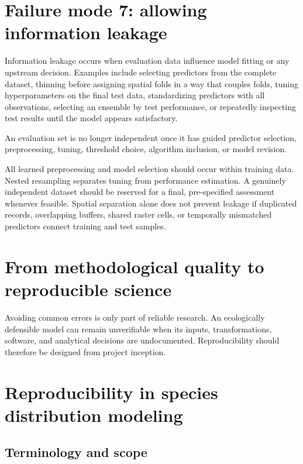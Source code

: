 \section{Failure mode 7: allowing information leakage}

Information leakage occurs when evaluation data influence model fitting or any upstream decision. Examples include selecting predictors from the complete dataset, thinning before assigning spatial folds in a way that couples folds, tuning hyperparameters on the final test data, standardizing predictors with all observations, selecting an ensemble by test performance, or repeatedly inspecting test results until the model appears satisfactory.

\begin{sdmwarningbox}
An evaluation set is no longer independent once it has guided predictor selection, preprocessing, tuning, threshold choice, algorithm inclusion, or model revision.
\end{sdmwarningbox}

All learned preprocessing and model selection should occur within training data. Nested resampling separates tuning from performance estimation. A genuinely independent dataset should be reserved for a final, pre-specified assessment whenever feasible. Spatial separation alone does not prevent leakage if duplicated records, overlapping buffers, shared raster cells, or temporally mismatched predictors connect training and test samples.

\section{From methodological quality to reproducible science}

Avoiding common errors is only part of reliable research. An ecologically defensible model can remain unverifiable when its inputs, transformations, software, and analytical decisions are undocumented. Reproducibility should therefore be designed from project inception.

\section{Reproducibility in species distribution modeling}

\subsection{Terminology and scope}

